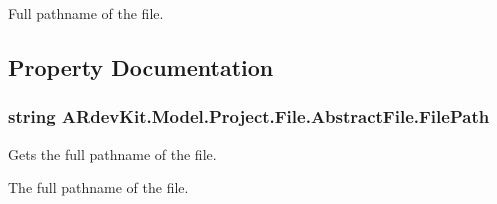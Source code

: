 Full pathname of the file. 



\subsection{Property Documentation}
\hypertarget{class_a_rdev_kit_1_1_model_1_1_project_1_1_file_1_1_abstract_file_ac55b0e087f42f7ab5ce36fa3bce111ab}{
\subsubsection[{File\-Path}]{\setlength{\rightskip}{0pt plus 5cm}string A\-Rdev\-Kit.\-Model.\-Project.\-File.\-Abstract\-File.\-File\-Path\hspace{0.3cm}{\ttfamily [get]}}}\label{class_a_rdev_kit_1_1_model_1_1_project_1_1_file_1_1_abstract_file_ac55b0e087f42f7ab5ce36fa3bce111ab}


Gets the full pathname of the file. 

The full pathname of the file. 